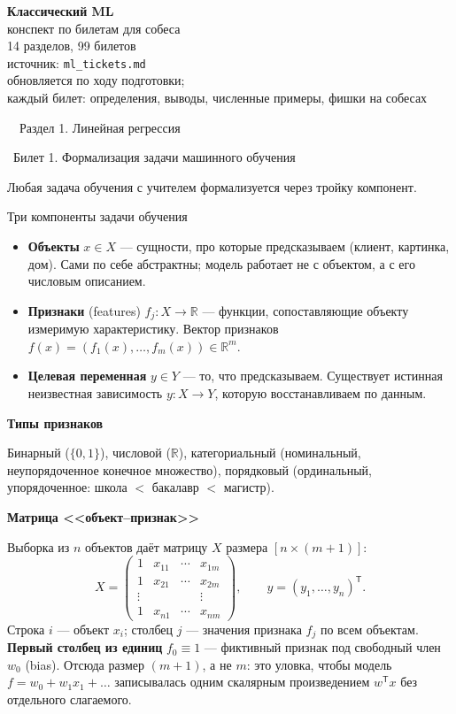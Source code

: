 \documentclass[12pt, a4paper]{article}
\newcommand{\razdel}[2]{%
  \clearpage%
  \noindent\colorbox{razdelcol}{\parbox{\dimexpr\linewidth-2\fboxsep\relax}{%
    \color{white}\LARGE\bfseries\strut\ \ Раздел #1. #2%
  }}%
  \vspace{10pt}%
}
\newcommand{\bilet}[2]{%
  \vspace{10pt}%
  \noindent\colorbox{qcolor}{\parbox{\dimexpr\linewidth-2\fboxsep\relax}{%
    \color{white}\large\bfseries\strut\ Билет #1. #2%
  }}%
  \nopagebreak\vspace{5pt}\par\nopagebreak%
}
\newcommand{\qsub}[1]{%
  \vspace{5pt}%
  {\bfseries\color{defblue} #1}%
  \par\vspace{2pt}%
}
\newcommand{\R}{\mathbb{R}}
\newcommand{\tr}{^{\mathsf{T}}}
\begin{document}
\begin{titlepage}
\centering
\vspace*{4cm}
{\Huge\bfseries Классический ML}\\[0.6em]
{\Large конспект по билетам для собеса}\\[2cm]
{\large 14 разделов, 99 билетов}\\[0.4em]
{\large\color{gray} источник: \texttt{ml\_tickets.md}}\\[3cm]
{\color{gray} обновляется по ходу подготовки; \\ каждый билет: определения, выводы, численные примеры, фишки на собесах}
\end{titlepage}

\razdel{1}{Линейная регрессия}

\bilet{1}{Формализация задачи машинного обучения}

Любая задача обучения с учителем формализуется через тройку компонент.

\begin{defbox}{Три компоненты задачи обучения}
\begin{itemize}
  \item \textbf{Объекты} $x \in X$ --- сущности, про которые предсказываем (клиент, картинка, дом). Сами по себе абстрактны; модель работает не с объектом, а с его числовым описанием.
  \item \textbf{Признаки} (features) $f_j\colon X \to \R$ --- функции, сопоставляющие объекту измеримую характеристику. Вектор признаков $f(x) = (f_1(x),\ldots,f_m(x)) \in \R^m$.
  \item \textbf{Целевая переменная} $y \in Y$ --- то, что предсказываем. Существует истинная неизвестная зависимость $y\colon X \to Y$, которую восстанавливаем по данным.
\end{itemize}
\end{defbox}

\qsub{Типы признаков}
Бинарный ($\{0,1\}$), числовой ($\R$), категориальный (номинальный, неупорядоченное конечное множество), порядковый (ординальный, упорядоченное: школа $<$ бакалавр $<$ магистр).

\qsub{Матрица <<объект--признак>>}
Выборка из $n$ объектов даёт матрицу $X$ размера $[n \times (m+1)]$:
\[
  X = \begin{pmatrix}
    1 & x_{11} & \cdots & x_{1m}\\
    1 & x_{21} & \cdots & x_{2m}\\
    \vdots & & & \vdots\\
    1 & x_{n1} & \cdots & x_{nm}
  \end{pmatrix}, \qquad y = (y_1,\ldots,y_n)\tr.
\]
Строка $i$ --- объект $x_i$; столбец $j$ --- значения признака $f_j$ по всем объектам. \textbf{Первый столбец из единиц} $f_0 \equiv 1$ --- фиктивный признак под свободный член $w_0$ (bias). Отсюда размер $(m{+}1)$, а не $m$: это уловка, чтобы модель $f = w_0 + w_1 x_1 + \dots$ записывалась одним скалярным произведением $w\tr x$ без отдельного слагаемого.
\end{document}
